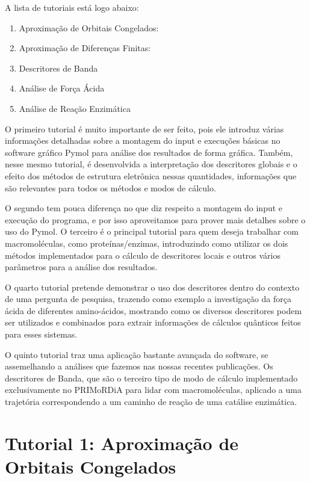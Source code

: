 \documentclass[a4paper,11pt]{refart}
\begin{document}
A lista de tutoriais está logo abaixo:

\begin{enumerate}
	\item Aproximação de Orbitais Congelados:
	\item Aproximação de Diferenças Finitas:
	\item Descritores de Banda
	\item Análise de Força Ácida
	\item Análise de Reação Enzimática
\end{enumerate}

O primeiro tutorial é muito importante de ser feito, pois ele introduz várias informações detalhadas sobre a montagem do input e execuções básicas no software gráfico Pymol para análise dos resultados de forma gráfica. Também, nesse mesmo tutorial, é desenvolvida a interpretação dos descritores globais e o efeito dos métodos de estrutura eletrônica nessas quantidades, informações que são relevantes para todos os métodos e modos de cálculo. 

O segundo tem pouca diferença no que diz respeito a montagem do input e execução do programa, e por isso aproveitamos para prover mais detalhes sobre o uso do Pymol. O terceiro é o principal tutorial para quem deseja trabalhar com macromoléculas, como proteínas/enzimas, introduzindo como utilizar os dois métodos implementados para o cálculo de descritores locais e outros vários parâmetros para a análise dos resultados.

O quarto tutorial pretende demonstrar o uso dos descritores dentro do contexto de uma pergunta de pesquisa, trazendo como exemplo a investigação da força ácida de diferentes amino-ácidos, mostrando como os diversos descritores podem ser utilizados e combinados para extrair informações de cálculos quânticos feitos para esses sistemas. 

O quinto tutorial traz uma aplicação bastante avançada do software, se assemelhando a análises que fazemos nas nossas recentes publicações. Os descritores de Banda, que são o terceiro tipo de modo de cálculo implementado exclusivamente no PRIMoRDiA para lidar com macromoléculas, aplicado a uma trajetória correspondendo a um caminho de reação de uma catálise enzimática. 

\newpage
\section{Tutorial 1: Aproximação de Orbitais Congelados}
\end{document}
